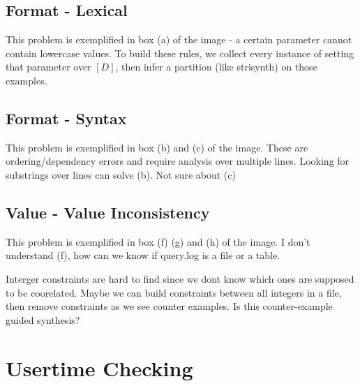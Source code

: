 \documentclass{article}
\begin{document}
\subsection{Format - Lexical}
This problem is exemplified in box (a) of the image - a certain parameter cannot contain lowercase values.
To build these rules, we collect every instance of setting that parameter over $[D]$, then infer a partition (like strisynth) on those examples.

\subsection{Format - Syntax}
This problem is exemplified in box (b) and (c) of the image.
These are ordering/dependency errors and require analysis over multiple lines.
Looking for substrings over lines can solve (b).
Not sure about (c)

\subsection{Value - Value Inconsistency}
This problem is exemplified in box (f) (g) and (h) of the image.
I don't understand (f), how can we know if query.log is a file or a table.

Interger constraints are hard to find since we dont know which ones are supposed to be coorelated.
Maybe we can build constraints between all integers in a file, then remove constraints as we see counter examples.
Is this counter-example guided synthesis?

\section{Usertime Checking}




\end{document}
